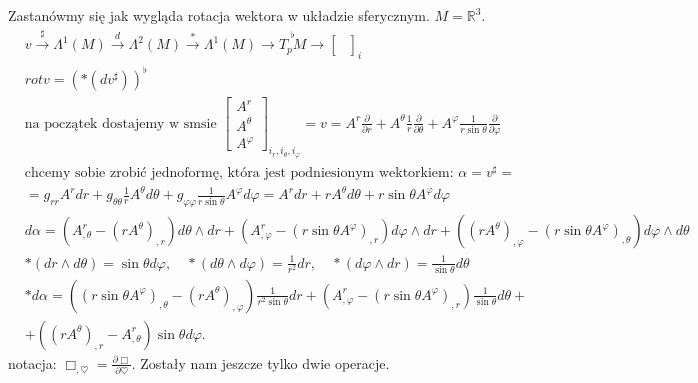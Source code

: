 \documentclass[../main.tex]{subfiles}
\begin{document}
\begin{przyklad}
    Zastanówmy się jak wygląda rotacja wektora w układzie sferycznym. $M = \mathbb{R}^3$.
    \begin{align*}
        &v \overset{\sharp}{\to} \Lambda^1(M) \overset{d}{\to} \Lambda^2(M) \overset{\ast}{\to} \Lambda^1(M) \to \overset{\flat}{T_pM} \to \begin{bmatrix} \\ \\ \end{bmatrix}_{i} \\
        &rot v = \left( \ast (d v^\sharp) \right)^{\flat}\\
        &\text{na początek dostajemy w smsie } \begin{bmatrix} A^r \\ A^\theta \\ A^\varphi \end{bmatrix}_{i_r, i_\theta, i_\varphi} = v = A^r \frac{\partial }{\partial r} + A^\theta \frac{1}{r} \frac{\partial }{\partial \theta} + A^\varphi \frac{1}{r\sin\theta} \frac{\partial }{\partial \varphi}\\
        &\text{chcemy sobie zrobić jednoformę, która jest podniesionym wektorkiem: } \alpha = v^\sharp = \\
        &= g_{rr} A^r dr + g_{\theta\theta} \frac{1}{r} A^\theta d\theta + g_{\varphi\varphi} \frac{1}{r\sin\theta}A^\varphi d\varphi = A^r dr + r A^\theta d\theta + r\sin\theta A^\varphi d\varphi \\
        &d\alpha = \left( A^r_{,\theta} - (rA^\theta)_{,r}  \right) d\theta \land dr + \left( A^r_{,\varphi} - (r\sin\theta A^\varphi)_{,r} \right) d\varphi \land dr + \left( (rA^\theta)_{,\varphi} - (r\sin\theta A^\varphi)_{,\theta} \right) d\varphi \land d\theta\\
        &\ast(dr\land d\theta) = \sin\theta d\varphi,\quad \ast(d\theta\land d\varphi) = \frac{1}{r^2}dr,\quad \ast(d\varphi\land dr) = \frac{1}{\sin\theta}d\theta\\
        &\ast d\alpha = \left( (r \sin\theta A^\varphi)_{,\theta} - (rA^\theta)_{,\varphi} \right)\frac{1}{r^2\sin\theta} dr + \left( A^r_{,\varphi} - (r\sin\theta A^\varphi)_{,r} \right) \frac{1}{\sin\theta} d\theta + \\
        & + \left( (rA^\theta)_{,r} - A^r_{,\theta} \right) \sin\theta d\varphi
    .\end{align*}
    notacja: $\Box_{,\heartsuit} = \frac{\partial \Box}{\partial \heartsuit}$. Zostały nam jeszcze tylko dwie operacje.

\end{przyklad}
\end{document}
